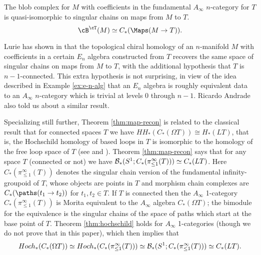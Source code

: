 \begin{thm}
\label{thm:map-recon}
The blob complex for $M$ with coefficients in the fundamental $A_\infty$ $n$-category for $T$ 
is quasi-isomorphic to singular chains on maps from $M$ to $T$.
$$\cB^\cT(M) \simeq C_*(\Maps(M\to T)).$$
\end{thm}
\begin{rem}
Lurie has shown in \cite[Theorem 3.8.6]{0911.0018} that the topological chiral homology 
of an $n$-manifold $M$ with coefficients in a certain $E_n$ algebra constructed from $T$ recovers 
the same space of singular chains on maps from $M$ to $T$, with the additional hypothesis that $T$ is $n{-}1$-connected.
This extra hypothesis is not surprising, in view of the idea described in Example \ref{ex:e-n-alg} 
that an $E_n$ algebra is roughly equivalent data to an $A_\infty$ $n$-category which 
is trivial at levels 0 through $n-1$.
Ricardo Andrade also told us about a similar result.

Specializing still further, Theorem \ref{thm:map-recon} is related to the classical result that for connected spaces $T$
we have $HH_*(C_*(\Omega T)) \cong H_*(LT)$, that is, the Hochschild homology of based loops in $T$ is isomorphic
to the homology of the free loop space of $T$ (see \cite{MR793184} and \cite{MR842427}).
Theorem \ref{thm:map-recon} says that for any space $T$ (connected or not) we have
${\mathcal B}_*(S^1; C_*(\pi^\infty_{\le 1}(T))) \simeq C_*(LT)$.
Here $C_*(\pi^\infty_{\le 1}(T))$ denotes the singular chain version of the fundamental infinity-groupoid of $T$, 
whose objects are points in $T$ and morphism chain complexes are $C_*(\paths(t_1 \to t_2))$ for $t_1, t_2 \in T$.
If $T$ is connected then the $A_\infty$ 1-category $C_*(\pi^\infty_{\le 1}(T))$ is Morita equivalent to the
$A_\infty$ algebra $C_*(\Omega T)$; 
the bimodule for the equivalence is the singular chains of the space of paths which start at the base point of $T$.
Theorem \ref{thm:hochschild} holds for $A_\infty$ 1-categories (though we do not prove that in this paper),
which then implies that
\[
	Hoch_*(C_*(\Omega T)) \simeq Hoch_*(C_*(\pi^\infty_{\le 1}(T)))
			\simeq {\mathcal B}_*(S^1; C_*(\pi^\infty_{\le 1}(T))) \simeq C_*(LT) .
\]
\end{rem}

